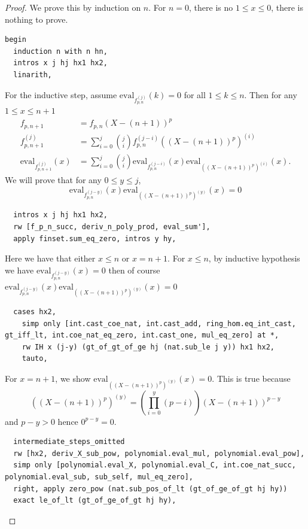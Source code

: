 \documentclass{report}
\theoremstyle{definition}
\begin{document}
\begin{proof}
We prove this by induction on $n$.
For $n=0$, there is no $1\le x\le0$, there is nothing to prove.
\begin{verbatim}
begin
  induction n with n hn,
  intros x j hj hx1 hx2,
  linarith,
\end{verbatim}
For the inductive step, assume $\mathrm{eval}_{f_{p,n}^{(j)}}(k) = 0$ for all $1\le k\le n$. Then for any $1\le x\le n+1$
\begin{equation*}
\begin{aligned}
f_{p,n+1}&=f_{p,n}(X-(n+1))^p\\
f_{p,n+1}^{(j)}&=\sum_{i=0}^j{j\choose i}f_{p,n}^{(j-i)}\left((X-(n+1))^p\right)^{(i)}\\
\mathrm{eval}_{f_{p,n+1}^{(j)}}(x)&=\sum_{i=0}^j{j\choose i}\mathrm{eval}_{f_{p,n}^{(j-i)}}(x)\mathrm{eval}_{\left((X-(n+1))^p\right)^{(i)}}(x).
\end{aligned}
\end{equation*} 
We will prove that for any $0\le y\le j$, 
$$\mathrm{eval}_{f_{p,n}^{(j-y)}}(x)\mathrm{eval}_{\left((X-(n+1))^p\right)^{(y)}}(x)=0$$

\begin{verbatim}
  intros x j hj hx1 hx2,
  rw [f_p_n_succ, deriv_n_poly_prod, eval_sum'], 
  apply finset.sum_eq_zero, intros y hy,
\end{verbatim}

Here we have that either $x\le n$ or $x = n+1$. For $x\le n$, by inductive hypothesis we have $\mathrm{eval}_{f_{p,n}^{(j-y)}}(x)=0$ then of course $\mathrm{eval}_{f_{p,n}^{(j-y)}}(x)\mathrm{eval}_{\left((X-(n+1))^p\right)^{(y)}}(x)=0$

\begin{verbatim}
  cases hx2,
    simp only [int.cast_coe_nat, int.cast_add, ring_hom.eq_int_cast, gt_iff_lt, int.coe_nat_eq_zero, int.cast_one, mul_eq_zero] at *,
    rw IH x (j-y) (gt_of_gt_of_ge hj (nat.sub_le j y)) hx1 hx2,
    tauto,
\end{verbatim}

For $x=n+1$, we show $\mathrm{eval}_{\left((X-(n+1))^p\right)^{(y)}}(x)=0$. This is true because
$$
\left((X-(n+1))^p\right)^{(y)}=\left(\prod_{i=0}^y(p-i)\right)(X-(n+1))^{p-y}
$$
and $p-y>0$ hence $0^{p-y}=0$.
\begin{verbatim}
  intermediate_steps_omitted
  rw [hx2, deriv_X_sub_pow, polynomial.eval_mul, polynomial.eval_pow], 
  simp only [polynomial.eval_X, polynomial.eval_C, int.coe_nat_succ, polynomial.eval_sub, sub_self, mul_eq_zero], 
  right, apply zero_pow (nat.sub_pos_of_lt (gt_of_ge_of_gt hj hy))
  exact le_of_lt (gt_of_ge_of_gt hj hy),
\end{verbatim}
\end{proof}
\end{document}
